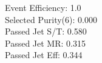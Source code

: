 Event Efficiency:   1.0\\ 
Selected Purity(6): 0.000\\ 
Passed Jet S/T:     0.580\\ 
Passed Jet MR:      0.315\\ 
Passed Jet Eff:     0.344